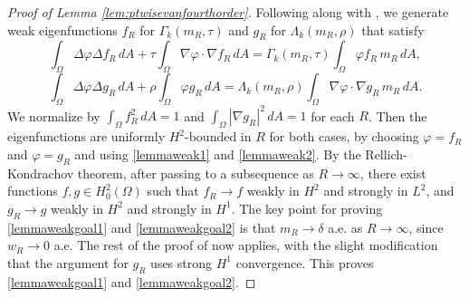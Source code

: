 \documentclass[11pt]{amsart}
\theoremstyle{definition}
\numberwithin{equation}{section}
\newcommand{\lapl}{\Delta}
\newcommand{\grad}{\nabla}
\begin{document}
\begin{proof}[Proof of Lemma \ref{lem:ptwisevanfourthorder}]
Following along with \cite[Lemma 8]{LL22}, we generate weak eigenfunctions $f_R$ for $\Gamma_k(m_R, \tau)$ and $g_R$ for $\Lambda_k(m_R,\rho)$ that satisfy
$$
\int_\Omega \lapl \varphi \lapl f_R \, dA + \tau \int_\Omega \grad \varphi \cdot \grad f_R\, dA
= \Gamma_k(m_R, \tau)\int_\Omega \varphi f_R\, m_R\, dA,
$$
$$
\int_\Omega \lapl \varphi \lapl g_R \, dA + \rho \int_\Omega \varphi g_R\, dA
= \Lambda_k(m_R, \rho)\int_\Omega \grad \varphi\cdot \grad g_R\, m_R\, dA.
$$
We normalize by $\int_\Omega f_R^2\,dA = 1$ and $\int_\Omega |\grad g_R|^2\,dA = 1$ for each $R$. Then the eigenfunctions are uniformly $H^2$-bounded in $R$ for both cases, by choosing $\varphi=f_R$ and $\varphi=g_R$ and using \eqref{lemmaweak1} and \eqref{lemmaweak2}. By the Rellich-Kondrachov theorem, after passing to a subsequence as $R\to\infty$, there exist functions $f,g \in H_0^2(\Omega)$ such that
$f_R \to f$ weakly in $H^2$ and strongly in $L^2$, and $g_R \to g$ weakly in $H^2$ and strongly in $H^1$. The key point for proving \eqref{lemmaweakgoal1} and \eqref{lemmaweakgoal2} is that $m_R \to \delta$ a.e. as $R\to\infty$, since $w_R \to 0$ a.e. The rest of the proof of \cite[Lemma 8]{LL22} now applies, with the slight modification that the argument for $g_R$ uses strong $H^1$ convergence. This proves \eqref{lemmaweakgoal1} and \eqref{lemmaweakgoal2}.
\end{proof}
\end{document}
